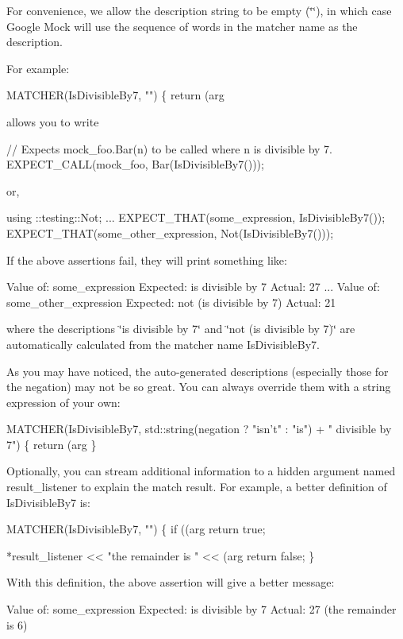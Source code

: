 For convenience, we allow the description string to be empty ({\ttfamily \char`\"{}\char`\"{}}), in which case Google Mock will use the sequence of words in the matcher name as the description.

For example\+: 
\begin{DoxyCode}
MATCHER(IsDivisibleBy7, "") \{ return (arg %
\end{DoxyCode}
 allows you to write 
\begin{DoxyCode}
// Expects mock\_foo.Bar(n) to be called where n is divisible by 7.
EXPECT\_CALL(mock\_foo, Bar(IsDivisibleBy7()));
\end{DoxyCode}
 or, 
\begin{DoxyCode}
using ::testing::Not;
...
  EXPECT\_THAT(some\_expression, IsDivisibleBy7());
  EXPECT\_THAT(some\_other\_expression, Not(IsDivisibleBy7()));
\end{DoxyCode}
 If the above assertions fail, they will print something like\+: 
\begin{DoxyCode}
  Value of: some\_expression
  Expected: is divisible by 7
    Actual: 27
...
  Value of: some\_other\_expression
  Expected: not (is divisible by 7)
    Actual: 21
\end{DoxyCode}
 where the descriptions {\ttfamily \char`\"{}is divisible by 7\char`\"{}} and {\ttfamily \char`\"{}not (is divisible
by 7)\char`\"{}} are automatically calculated from the matcher name {\ttfamily Is\+Divisible\+By7}.

As you may have noticed, the auto-\/generated descriptions (especially those for the negation) may not be so great. You can always override them with a string expression of your own\+: 
\begin{DoxyCode}
MATCHER(IsDivisibleBy7, std::string(negation ? "isn't" : "is") +
                        " divisible by 7") \{
  return (arg %
\}
\end{DoxyCode}


Optionally, you can stream additional information to a hidden argument named {\ttfamily result\+\_\+listener} to explain the match result. For example, a better definition of {\ttfamily Is\+Divisible\+By7} is\+: 
\begin{DoxyCode}
MATCHER(IsDivisibleBy7, "") \{
  if ((arg %
    return true;

  *result\_listener << "the remainder is " << (arg %
  return false;
\}
\end{DoxyCode}


With this definition, the above assertion will give a better message\+: 
\begin{DoxyCode}
Value of: some\_expression
Expected: is divisible by 7
  Actual: 27 (the remainder is 6)
\end{DoxyCode}


